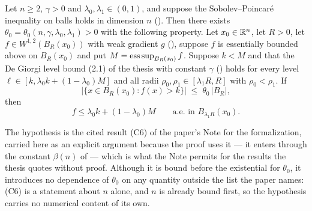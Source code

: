 \begin{lemma}[Lemma 2.3]
Let $n\ge2$, $\gamma>0$ and $\lambda_0,\lambda_1\in(0,1)$, and suppose the Sobolev--Poincar\'e inequality on balls holds in dimension $n$
().  Then there exists
$\theta_0=\theta_0(n,\gamma,\lambda_0,\lambda_1)>0$ with the following property.
Let $x_0\in\mathbb{R}^n$, let $R>0$, let $f\in W^{1,2}(B_R(x_0))$ with weak gradient $g$
(), suppose $f$ is essentially bounded above on $B_R(x_0)$ and
put $M=\operatorname*{ess\,sup}_{B_R(x_0)}f$.  Suppose $k<M$ and that the De Giorgi level bound
(2.1) of the thesis with constant $\gamma$ () holds for
every level $\ell\in[k,\lambda_0k+(1-\lambda_0)M]$ and all radii
$\rho_0,\rho_1\in[\lambda_1R,R]$ with $\rho_0<\rho_1$.  If
\[
\bigl|\{x\in B_R(x_0):f(x)>k\}\bigr|\;\le\;\theta_0\,|B_R| ,
\]
then
\[
f\le\lambda_0k+(1-\lambda_0)M\qquad\text{a.e.\ in }B_{\lambda_1R}(x_0).
\]

The hypothesis  is the cited result (C6) of the
paper's Note for the formalization, carried here as an explicit argument because
the proof uses it --- it enters through the constant $\beta(n)$ of  --- which is what the
Note permits for the results the thesis quotes without proof.  Although it is
bound before the existential for $\theta_0$, it introduces no dependence of
$\theta_0$ on any quantity outside the list the paper names: (C6) is a statement
about $n$ alone, and $n$ is already bound first, so the hypothesis carries no
numerical content of its own.
\end{lemma}
